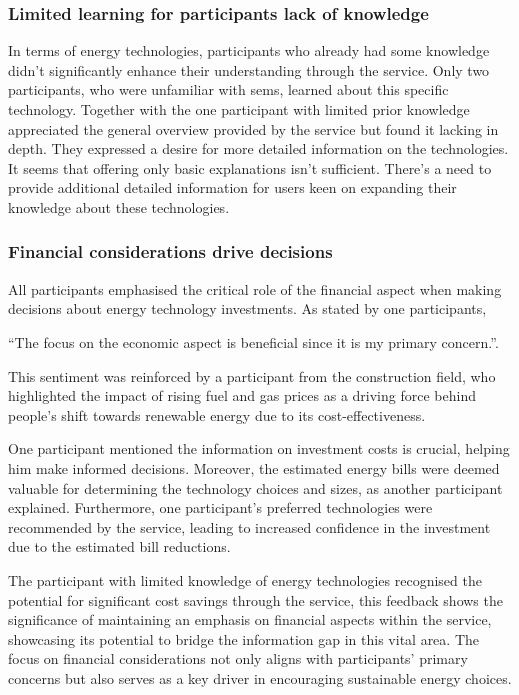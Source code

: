 \subsubsection{Limited learning for participants lack of knowledge}

In terms of energy technologies, participants who already had some knowledge didn't significantly enhance their understanding through the service. 
Only two participants, who were unfamiliar with \gls{sems}, learned about this specific technology. 
Together with the one participant with limited prior knowledge appreciated the general overview provided by the service but found it lacking in depth. 
They expressed a desire for more detailed information on the technologies. 
It seems that offering only basic explanations isn't sufficient. 
There's a need to provide additional detailed information for users keen on expanding their knowledge about these technologies.


\subsubsection{Financial considerations drive decisions}

All participants emphasised the critical role of the financial aspect when making decisions about energy technology investments. 
As stated by one participants, 
\begin{displayquote}
  ``The focus on the economic aspect is beneficial since it is my primary concern.''. 
\end{displayquote}
This sentiment was reinforced by a participant from the construction field, who highlighted the impact of rising fuel and gas prices as a driving force behind people's shift towards renewable energy due to its cost-effectiveness.

One participant mentioned the information on investment costs is crucial, helping him make informed decisions. 
Moreover, the estimated energy bills were deemed valuable for determining the technology choices and sizes, as another participant explained.
Furthermore, one participant's preferred technologies were recommended by the service, leading to increased confidence in the investment due to the estimated bill reductions.

The participant with limited knowledge of energy technologies recognised the potential for significant cost savings through the service, 
this feedback shows the significance of maintaining an emphasis on financial aspects within the service, 
showcasing its potential to bridge the information gap in this vital area. 
The focus on financial considerations not only aligns with participants' primary concerns but also serves as a key driver in encouraging sustainable energy choices.


